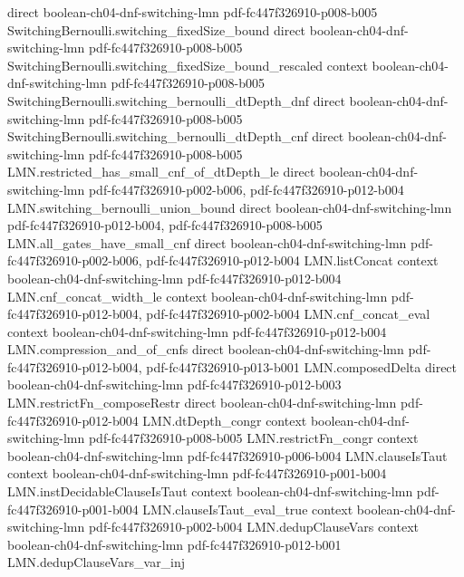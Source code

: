 \begin{theorem}
  {direct}
  {boolean-ch04-dnf-switching-lmn}
  {pdf-fc447f326910-p008-b005}
\proofstep
  {SwitchingBernoulli.switching_fixedSize_bound}
  {direct}
  {boolean-ch04-dnf-switching-lmn}
  {pdf-fc447f326910-p008-b005}
\proofstep
  {SwitchingBernoulli.switching_fixedSize_bound_rescaled}
  {context}
  {boolean-ch04-dnf-switching-lmn}
  {pdf-fc447f326910-p008-b005}
\proofstep
  {SwitchingBernoulli.switching_bernoulli_dtDepth_dnf}
  {direct}
  {boolean-ch04-dnf-switching-lmn}
  {pdf-fc447f326910-p008-b005}
\proofstep
  {SwitchingBernoulli.switching_bernoulli_dtDepth_cnf}
  {direct}
  {boolean-ch04-dnf-switching-lmn}
  {pdf-fc447f326910-p008-b005}
\proofstep
  {LMN.restricted_has_small_cnf_of_dtDepth_le}
  {direct}
  {boolean-ch04-dnf-switching-lmn}
  {pdf-fc447f326910-p002-b006,
    pdf-fc447f326910-p012-b004}
\proofstep
  {LMN.switching_bernoulli_union_bound}
  {direct}
  {boolean-ch04-dnf-switching-lmn}
  {pdf-fc447f326910-p012-b004,
    pdf-fc447f326910-p008-b005}
\proofstep
  {LMN.all_gates_have_small_cnf}
  {direct}
  {boolean-ch04-dnf-switching-lmn}
  {pdf-fc447f326910-p002-b006,
    pdf-fc447f326910-p012-b004}
\proofstep
  {LMN.listConcat}
  {context}
  {boolean-ch04-dnf-switching-lmn}
  {pdf-fc447f326910-p012-b004}
\proofstep
  {LMN.cnf_concat_width_le}
  {context}
  {boolean-ch04-dnf-switching-lmn}
  {pdf-fc447f326910-p012-b004,
    pdf-fc447f326910-p002-b004}
\proofstep
  {LMN.cnf_concat_eval}
  {context}
  {boolean-ch04-dnf-switching-lmn}
  {pdf-fc447f326910-p012-b004}
\proofstep
  {LMN.compression_and_of_cnfs}
  {direct}
  {boolean-ch04-dnf-switching-lmn}
  {pdf-fc447f326910-p012-b004,
    pdf-fc447f326910-p013-b001}
\proofstep
  {LMN.composedDelta}
  {direct}
  {boolean-ch04-dnf-switching-lmn}
  {pdf-fc447f326910-p012-b003}
\proofstep
  {LMN.restrictFn_composeRestr}
  {direct}
  {boolean-ch04-dnf-switching-lmn}
  {pdf-fc447f326910-p012-b004}
\proofstep
  {LMN.dtDepth_congr}
  {context}
  {boolean-ch04-dnf-switching-lmn}
  {pdf-fc447f326910-p008-b005}
\proofstep
  {LMN.restrictFn_congr}
  {context}
  {boolean-ch04-dnf-switching-lmn}
  {pdf-fc447f326910-p006-b004}
\proofstep
  {LMN.clauseIsTaut}
  {context}
  {boolean-ch04-dnf-switching-lmn}
  {pdf-fc447f326910-p001-b004}
\proofstep
  {LMN.instDecidableClauseIsTaut}
  {context}
  {boolean-ch04-dnf-switching-lmn}
  {pdf-fc447f326910-p001-b004}
\proofstep
  {LMN.clauseIsTaut_eval_true}
  {context}
  {boolean-ch04-dnf-switching-lmn}
  {pdf-fc447f326910-p002-b004}
\proofstep
  {LMN.dedupClauseVars}
  {context}
  {boolean-ch04-dnf-switching-lmn}
  {pdf-fc447f326910-p012-b001}
\proofstep
  {LMN.dedupClauseVars_var_inj}

\end{theorem}
